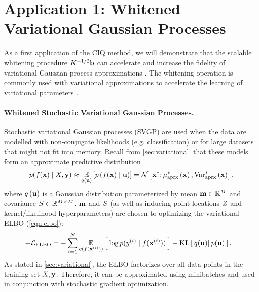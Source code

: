 \section{Application 1: Whitened Variational Gaussian Processes}
\label{sec:variational_results}

As a first application of the CIQ method, we will demonstrate that the scalable whitening procedure $K^{-1/2} \mathbf{b}$ can accelerate and increase the fidelity of variational Gaussian process approximations \cite{hensman2013gaussian,hensman2015scalable,matthews2017scalable}.
The whitening operation is commonly used with variational approximations to accelerate the learning of variational parameters \cite{matthews2017gpflow}.


\paragraph{Whitened Stochastic Variational Gaussian Processes.}
Stochastic variational Gaussian processes (SVGP) are used when the data are modelled with non-conjugate likelihoods (e.g. classification) or for large datasets that might not fit into memory.
Recall from \cref{sec:variational} that these models form an approximate predictive distribution
\[
  p(f(\bx) \mid \bX, \by) \approx \Evover{q(\bu)}{ p\left( f(\bx) \mid \bu \right)} = \normaldist{ \bxtest; \ameantest{ \bx }} { \avartest{ \bx }},
\]
where $q \left( \mathbf{u} \right)$ is a Gaussian distribution parameterized by mean $\mathbf{m} \in \mathbb{R}^M$ and covariance $S \in \mathbb{R}^{M \times M}$.
$\mathbf{m}$ and $S$ (as well as inducing point locations $Z$ and kernel/likelihood hyperparameters) are chosen to optimizing the variational ELBO (\cref{eqn:elbo}):
%
\begin{align*}
	-\mathcal L_\text{ELBO} &= -\sum_{i=1}^N \operatorname*{\mathbb{E}}_{q(f(\mathbf{x}^{(i)}))} \left[   \: \log p( y^{(i)} \mid f(\mathbf{x}^{(i)}) ) \:  \right] + \operatorname*{KL} \left[ \:  q(\mathbf{u})  \Vert  p(\mathbf{u})  \: \right].
\end{align*}
%
As stated in \cref{sec:variational}, the ELBO factorizes over all data points in the training set $X, \mathbf{y}$.
Therefore, it can be approximated using minibatches and used in conjunction with stochastic gradient optimization.

